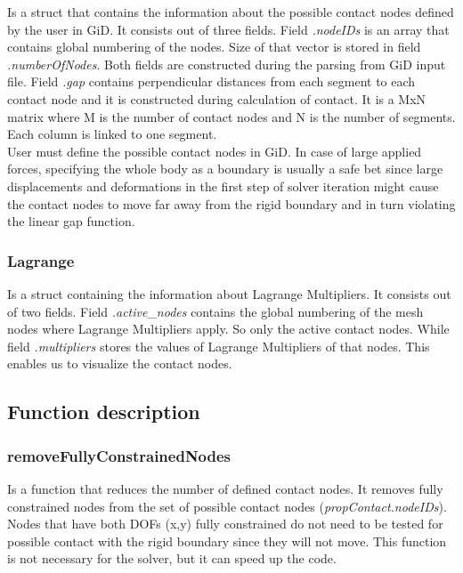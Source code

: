 \documentclass[10pt,a4paper]{article}
\begin{document}
Is a struct that contains the information about the possible contact nodes defined by the user in GiD. It consists out of three fields. Field \textit{.nodeIDs} is an array that contains global numbering of the nodes. Size of that vector is stored in field \textit{.numberOfNodes}. Both fields are constructed during the parsing from GiD input file. Field \textit{.gap} contains perpendicular distances from each segment to each contact node and it is constructed during calculation of contact. It is a MxN matrix where M is the number of contact nodes and N is the number of segments. Each column is linked to one segment.\\

User must define the possible contact nodes in GiD. In case of large applied forces, specifying the whole body as a boundary is usually a safe bet since large displacements and deformations in the first step of solver iteration might cause the contact nodes to move far away from the rigid boundary and in turn violating the linear gap function.


\subsubsection{Lagrange}

Is a struct containing the information about Lagrange Multipliers. It consists out of two fields. Field \textit{.active\_nodes} contains the global numbering of the mesh nodes where Lagrange Multipliers apply. So only the active contact nodes. While field \textit{.multipliers} stores the values of Lagrange Multipliers of that nodes. This enables us to visualize the contact nodes.




\subsection{Function description}

\subsubsection{removeFullyConstrainedNodes}

Is a function that reduces the number of defined contact nodes. It removes fully constrained nodes from the set of possible contact nodes (\textit{propContact.nodeIDs}). Nodes that have both DOFs (x,y) fully constrained do not need to be tested for possible contact with the rigid boundary since they will not move. This function is not necessary for the solver, but it can speed up the code. 
\end{document}
